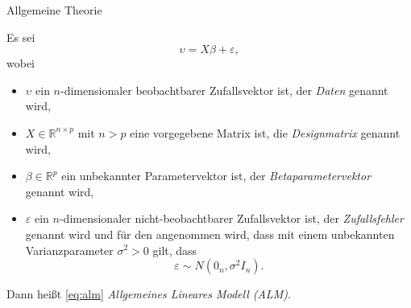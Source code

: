 \documentclass[
  8pt,
  ignorenonframetext,
]{beamer}
\begin{document}
\begin{frame}{Allgemeine Theorie}
\protect\hypertarget{allgemeine-theorie}{}
\small
\begin{definition}
Es sei
\begin{equation}\label{eq:alm}
\upsilon = X\beta + \varepsilon, 
\end{equation}
wobei
\begin{itemize}
\item $\upsilon$ ein $n$-dimensionaler beobachtbarer Zufallsvektor ist, der \textit{Daten} genannt wird,
\item $X \in \mathbb{R}^{n \times p}$ mit $n>p$ eine vorgegebene Matrix ist, die \textit{Designmatrix} genannt wird,
\item $\beta \in \mathbb{R}^p$ ein unbekannter Parametervektor ist, der \textit{Betaparametervektor} genannt wird, 
\item $\varepsilon$ ein $n$-dimensionaler nicht-beobachtbarer Zufallsvektor ist, der \textit{Zufallsfehler} genannt wird und für den angenommen wird, dass
mit einem unbekannten Varianzparameter $\sigma^2>0$ gilt, dass
\begin{equation}
\varepsilon \sim N\left(0_n, \sigma^2I_n\right).
\end{equation}
\end{itemize}
Dann heißt \eqref{eq:alm} \textit{Allgemeines Lineares Modell (ALM)}.
\end{definition}
\end{frame}
\end{document}
